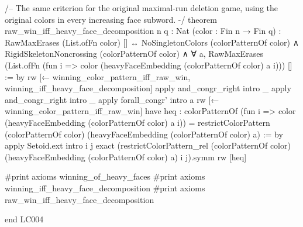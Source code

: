 \documentclass[11pt,reqno]{amsart}
\theoremstyle{definition}
\begin{document}
\begin{LeanCode}
/-- The same criterion for the original maximal-run deletion game, using
the original colors in every increasing face subword. -/
theorem raw_win_iff_heavy_face_decomposition {n q : Nat} (color : Fin n → Fin q) :
    RawMaxErases (List.ofFn color) [] ↔
      NoSingletonColors (colorPatternOf color) ∧
      RigidSkeletonNoncrossing (colorPatternOf color) ∧
      ∀ a, RawMaxErases (List.ofFn (fun i =>
        color (heavyFaceEmbedding (colorPatternOf color) a i))) [] := by
  rw [← winning_color_pattern_iff_raw_win, winning_iff_heavy_face_decomposition]
  apply and_congr_right
  intro _
  apply and_congr_right
  intro _
  apply forall_congr'
  intro a
  rw [← winning_color_pattern_iff_raw_win]
  have heq : colorPatternOf (fun i =>
      color (heavyFaceEmbedding (colorPatternOf color) a i)) =
      restrictColorPattern (colorPatternOf color) (heavyFaceEmbedding (colorPatternOf color) a) := by
    apply Setoid.ext
    intro i j
    exact (restrictColorPattern_rel (colorPatternOf color)
      (heavyFaceEmbedding (colorPatternOf color) a) i j).symm
  rw [heq]

#print axioms winning_of_heavy_faces
#print axioms winning_iff_heavy_face_decomposition
#print axioms raw_win_iff_heavy_face_decomposition

end LC004
\end{LeanCode}
\end{document}
